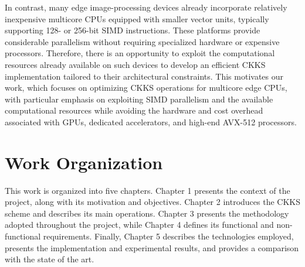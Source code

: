 In contrast, many edge image-processing devices already incorporate relatively inexpensive multicore CPUs equipped with smaller vector units, typically supporting 128- or 256-bit SIMD instructions. These platforms provide considerable parallelism without requiring specialized hardware or expensive processors. Therefore, there is an opportunity to exploit the computational resources already available on such devices to develop an efficient CKKS implementation tailored to their architectural constraints. This motivates our work, which focuses on optimizing CKKS operations for multicore edge CPUs, with particular emphasis on exploiting SIMD parallelism and the available computational resources while avoiding the hardware and cost overhead associated with GPUs, dedicated accelerators, and high-end AVX-512 processors.

\section{Work Organization}

This work is organized into five chapters. Chapter 1 presents the context of the project, along with its motivation and objectives. Chapter 2 introduces the CKKS scheme and describes its main operations. Chapter 3 presents the methodology adopted throughout the project, while Chapter 4 defines its functional and non-functional requirements. Finally, Chapter 5 describes the technologies employed, presents the implementation and experimental results, and provides a comparison with the state of the art.

